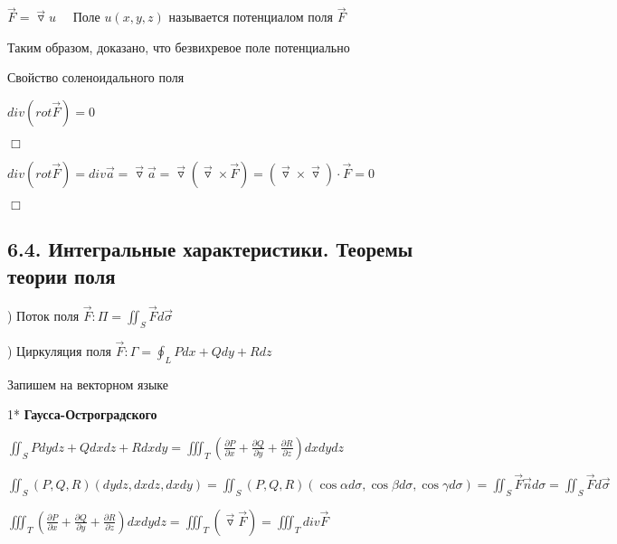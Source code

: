 \documentclass[12pt]{article}
\begin{document}
    \Def $\overrightarrow{F} = \overrightarrow{\triangledown} u \quad$ Поле $u(x, y, z)$ называется потенциалом поля $\overrightarrow{F}$

    Таким образом, доказано, что безвихревое поле потенциально

    \hypertarget{solenoidalfieldproperty}{}

     Свойство соленоидального поля

    $div (rot \overrightarrow{F}) = 0$

    $\Box$

    $div (rot \overrightarrow{F}) = div \overrightarrow{a} = \overrightarrow{\triangledown} \overrightarrow{a} = \overrightarrow{\triangledown} (\overrightarrow{\triangledown} \times \overrightarrow{F}) = (\overrightarrow{\triangledown} \times \overrightarrow{\triangledown}) \cdot \overrightarrow{F} = 0$

    $\Box$

    \hypertarget{integralcharacteristics}{}

    \subsection{6.4. Интегральные характеристики. Теоремы теории поля}

    ) Поток поля $\overrightarrow{F}: \Pi = \iint_S \overrightarrow{F}d\overrightarrow{\sigma}$

    ) Циркуляция поля $\overrightarrow{F}: \Gamma = \oint_L Pdx + Qdy + Rdz$

    \Nota Запишем \Ths на векторном языке

    \hypertarget{theoremGaussOstrogradskyyinvectorform}{}

    1* \textbf{Гаусса-Остроградского}

    $\iint_S Pdydz + Qdxdz + Rdxdy = \iiint_T \left(\frac{\partial P}{\partial x} + \frac{\partial Q}{\partial y} + \frac{\partial R}{\partial z}\right) dxdydz$

    $\iint_S (P, Q, R) (dydz, dxdz, dxdy) = \iint_S (P, Q, R) (\cos\alpha d\sigma, \cos\beta d\sigma, \cos\gamma d\sigma) =
    \iint_S \overrightarrow{F} \overrightarrow{n} d\sigma = \iint_S \overrightarrow{F} d\overrightarrow{\sigma}$

    $\iiint_T \left(\frac{\partial P}{\partial x} + \frac{\partial Q}{\partial y} + \frac{\partial R}{\partial z}\right) dxdydz = \iiint_T (\overrightarrow{\triangledown} \overrightarrow{F}) = \iiint_T div \overrightarrow{F}$
\end{document}
